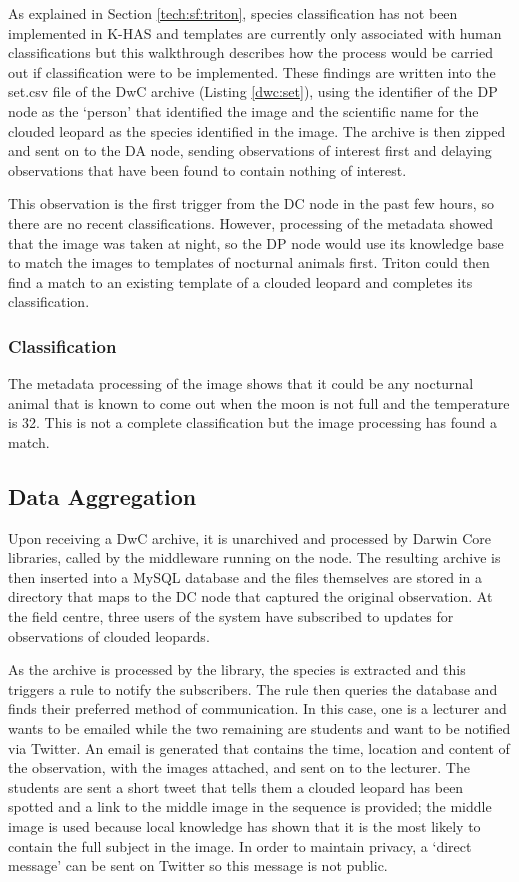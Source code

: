		As explained in Section \ref{tech:sf:triton}, species classification has not been implemented in K-HAS and templates are currently only associated with human classifications but this walkthrough describes how the process would be carried out if classification were to be implemented. These findings are written into the set.csv file of the DwC archive (Listing \ref{dwc:set}), using the identifier of the DP node as the `person' that identified the image and the scientific name for the clouded leopard as the species identified in the image. The archive is then zipped and sent on to the DA node, sending observations of interest first and delaying observations that have been found to contain nothing of interest.
				
		This observation is the first trigger from the DC node in the past few hours, so there are no recent classifications. However, processing of the metadata showed that the image was taken at night, so the DP node would use its knowledge base to match the images to templates of nocturnal animals first. Triton could then find a match to an existing template of a clouded leopard and completes its classification.
	
		\subsubsection{Classification}
		The metadata processing of the image shows that it could be any nocturnal animal that is known to come out when the moon is not full and the temperature is 32\celsius. This is not a complete classification but the image processing has found a match. 		
	\subsection{Data Aggregation}		
			Upon receiving a DwC archive, it is unarchived and processed by Darwin Core libraries, called by the middleware running on the node. The resulting archive is then inserted into a MySQL database and the files themselves are stored in a directory that maps to the DC node that captured the original observation. At the field centre, three users of the system have subscribed to updates for observations of clouded leopards.
			
			As the archive is processed by the library, the species is extracted and this triggers a rule to notify the subscribers. The rule then queries the database and finds their preferred method of communication. In this case, one is a lecturer and wants to be emailed while the two remaining are students and want to be notified via Twitter. An email is generated that contains the time, location and content of the observation, with the images attached, and sent on to the lecturer. The students are sent a short tweet that tells them a clouded leopard has been spotted and a link to the middle image in the sequence is provided; the middle image is used because local knowledge has shown that it is the most likely to contain the full subject in the image. In order to maintain privacy, a `direct message' can be sent on Twitter so this message is not public.
			
